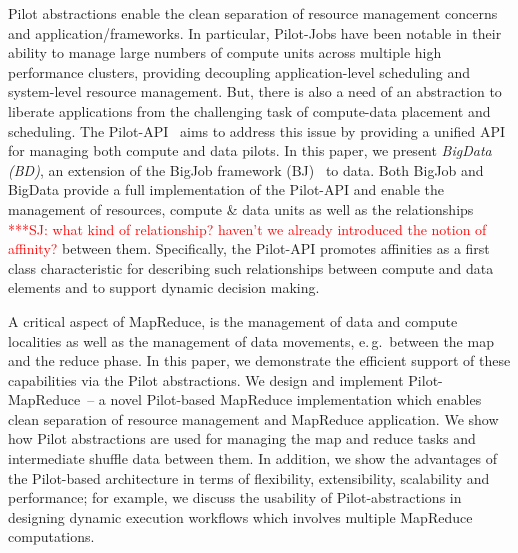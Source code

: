\documentclass{acm_proc_article-sp}
\newcommand{\jhanote}[1]{ {\textcolor{red} { ***SJ: #1 }}}
\newcommand{\jhanote}[1]{}
\newcommand{\pilot}{Pilot\xspace}
\newcommand{\pilotjobs}{Pilot-Jobs\xspace}
\newcommand{\pilotmapreduce}{Pilot-MapReduce\xspace}
\begin{document}


Pilot abstractions enable the clean separation of resource management
concerns and application/frameworks. In particular, \pilotjobs have
been notable in their ability to manage large numbers of compute units
across multiple high performance clusters, providing decoupling
application-level scheduling and system-level resource
management. But, there is also a need of an abstraction to liberate
applications from the challenging task of compute-data placement and
scheduling. The Pilot-API~\cite{pstar-2012} aims to address this issue
by providing a unified API for managing both compute and data
pilots. In this paper, we present \emph{BigData (BD)}, an extension of
the BigJob framework (BJ)~\cite{bigjob_web} to data. Both BigJob and
BigData provide a full implementation of the Pilot-API and enable the
management of resources, compute \& data units as well as the
relationships \jhanote{what kind of relationship? haven't we already
  introduced the notion of affinity?}  between them. Specifically, the
Pilot-API promotes affinities as a first class characteristic for
describing such relationships between compute and data elements and to
support dynamic decision making.


A critical aspect of MapReduce, is the management of data and compute
localities as well as the management of data movements, e.\,g.\
between the map and the reduce phase.  In this paper, we demonstrate
the efficient support of these capabilities via the Pilot
abstractions. We design and implement \pilotmapreduce \ -- a novel
\pilot-based MapReduce implementation which enables clean separation
of resource management and MapReduce application. We show how \pilot
abstractions are used for managing the map and reduce tasks and
intermediate shuffle data between them.  In addition, we show the
advantages of the \pilot-based architecture in terms of flexibility,
extensibility, scalability and performance; for example, we discuss
the usability of \pilot-abstractions in designing dynamic execution
workflows which involves multiple MapReduce computations.
\end{document}
